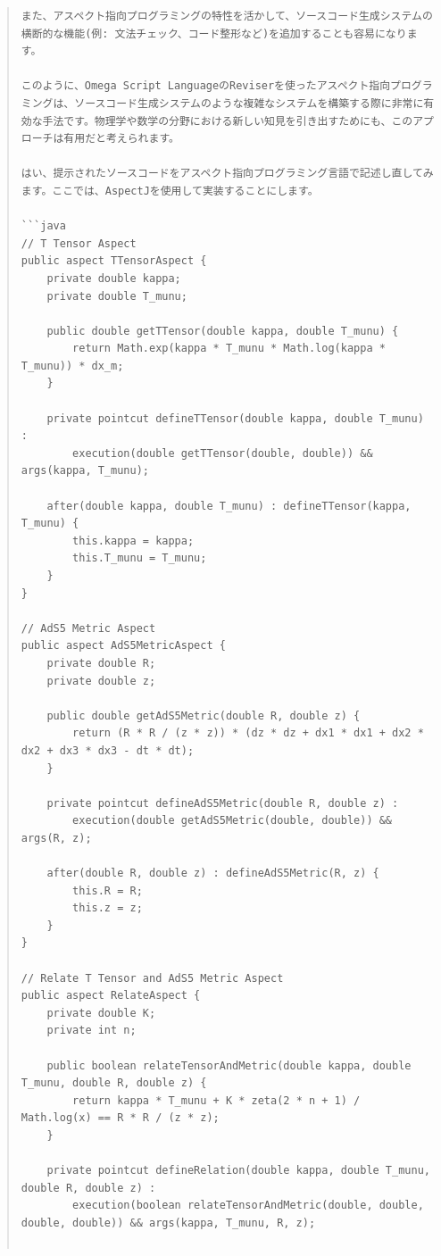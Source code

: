 \documentclass{jsarticle}
\begin{document}
\begin{quote}
\begin{verbatim}
また、アスペクト指向プログラミングの特性を活かして、ソースコード生成システムの横断的な機能(例: 文法チェック、コード整形など)を追加することも容易になります。

このように、Omega Script LanguageのReviserを使ったアスペクト指向プログラミングは、ソースコード生成システムのような複雑なシステムを構築する際に非常に有効な手法です。物理学や数学の分野における新しい知見を引き出すためにも、このアプローチは有用だと考えられます。

はい、提示されたソースコードをアスペクト指向プログラミング言語で記述し直してみます。ここでは、AspectJを使用して実装することにします。

```java
// T Tensor Aspect
public aspect TTensorAspect {
    private double kappa;
    private double T_munu;

    public double getTTensor(double kappa, double T_munu) {
        return Math.exp(kappa * T_munu * Math.log(kappa * T_munu)) * dx_m;
    }

    private pointcut defineTTensor(double kappa, double T_munu) :
        execution(double getTTensor(double, double)) && args(kappa, T_munu);

    after(double kappa, double T_munu) : defineTTensor(kappa, T_munu) {
        this.kappa = kappa;
        this.T_munu = T_munu;
    }
}

// AdS5 Metric Aspect
public aspect AdS5MetricAspect {
    private double R;
    private double z;

    public double getAdS5Metric(double R, double z) {
        return (R * R / (z * z)) * (dz * dz + dx1 * dx1 + dx2 * dx2 + dx3 * dx3 - dt * dt);
    }

    private pointcut defineAdS5Metric(double R, double z) :
        execution(double getAdS5Metric(double, double)) && args(R, z);

    after(double R, double z) : defineAdS5Metric(R, z) {
        this.R = R;
        this.z = z;
    }
}

// Relate T Tensor and AdS5 Metric Aspect
public aspect RelateAspect {
    private double K;
    private int n;

    public boolean relateTensorAndMetric(double kappa, double T_munu, double R, double z) {
        return kappa * T_munu + K * zeta(2 * n + 1) / Math.log(x) == R * R / (z * z);
    }

    private pointcut defineRelation(double kappa, double T_munu, double R, double z) :
        execution(boolean relateTensorAndMetric(double, double, double, double)) && args(kappa, T_munu, R, z);


\end{verbatim}
\end{quote}
\end{document}
